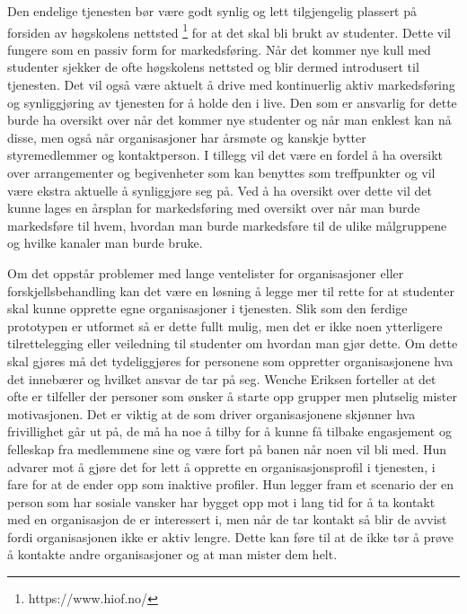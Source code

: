 Den endelige tjenesten bør være godt synlig og lett tilgjengelig plassert på forsiden av høgskolens nettsted \footnote{https://www.hiof.no/} for at det skal bli brukt av studenter. Dette vil fungere som en passiv form for markedsføring. Når det kommer nye kull med studenter sjekker de ofte høgskolens nettsted og blir dermed introdusert til tjenesten. Det vil også være aktuelt å drive med kontinuerlig aktiv markedsføring og synliggjøring av tjenesten for å holde den i live. Den som er ansvarlig for dette burde ha oversikt over når det kommer nye studenter og når man enklest kan nå disse, men også når organisasjoner har årsmøte og kanskje bytter styremedlemmer og kontaktperson. I tillegg vil det være en fordel å ha oversikt over arrangementer og begivenheter som kan benyttes som treffpunkter og vil være ekstra aktuelle å synliggjøre seg på. Ved å ha oversikt over dette vil det kunne lages en årsplan for markedsføring med oversikt over når man burde markedsføre til hvem, hvordan man burde markedsføre til de ulike målgruppene og hvilke kanaler man burde bruke.

Om det oppstår problemer med lange ventelister for organisasjoner eller forskjellsbehandling kan det være en løsning å legge mer til rette for at studenter skal kunne opprette egne organisasjoner i tjenesten. Slik som den ferdige prototypen er utformet så er dette fullt mulig, men det er ikke noen ytterligere tilrettelegging eller veiledning til studenter om hvordan man gjør dette. Om dette skal gjøres må det tydeliggjøres for personene som oppretter organisasjonene hva det innebærer og hvilket ansvar de tar på seg. 
Wenche Eriksen forteller at det ofte er tilfeller der personer som ønsker å starte opp grupper men plutselig mister motivasjonen. Det er viktig at de som driver organisasjonene skjønner hva frivillighet går ut på, de må ha noe å tilby for å kunne få tilbake engasjement og felleskap fra medlemmene sine og være fort på banen når noen vil bli med. Hun advarer mot å gjøre det for lett å opprette en organisasjonsprofil i tjenesten, i fare for at de ender opp som inaktive profiler. Hun legger fram et scenario der en person som har sosiale vansker har bygget opp mot i lang tid for å ta kontakt med en organisasjon de er interessert i, men når de tar kontakt så blir de avvist fordi organisasjonen ikke er aktiv lengre. Dette kan føre til at de ikke tør å prøve å kontakte andre organisasjoner og at man mister dem helt. \cite{FRIVILLIGSENTRALEN-INTERVJU:21}


